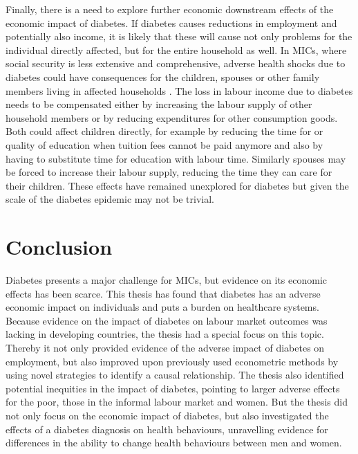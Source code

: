 Finally, there is a need to explore further economic downstream effects of the economic impact of diabetes. If diabetes causes reductions in employment and potentially also income, it is likely that these will cause not only problems for the individual directly affected, but for the entire household as well. In \acp{MIC}, where social security is less extensive and comprehensive, adverse health shocks due to diabetes could have consequences for the children, spouses or other family members living in affected households \parencite{Alam2014}. The loss in labour income due to diabetes needs to be compensated either by increasing the labour supply of other household members or by reducing expenditures for other consumption goods. Both could affect children directly, for example by reducing the time for or quality of education when tuition fees cannot be paid anymore and also by having to substitute time for education with labour time. Similarly spouses may be forced to increase their labour supply, reducing the time they can care for their children. These effects have remained unexplored for diabetes but given the scale of the diabetes epidemic may not be trivial.



\section{Conclusion}

Diabetes presents a major challenge for \acp{MIC}, but evidence on its economic effects has been scarce. This thesis has found that diabetes has an adverse economic impact on individuals and puts a burden on healthcare systems. Because evidence on the impact of diabetes on labour market outcomes was lacking in developing countries, the thesis had a special focus on this topic. Thereby it not only provided evidence of the adverse impact of diabetes on employment, but also improved upon previously used econometric methods by using novel strategies to identify a causal relationship. The thesis also identified potential inequities in the impact of diabetes, pointing to larger adverse effects for the poor, those in the informal labour market and women. But the thesis did not only focus on the economic impact of diabetes, but also investigated the effects of a diabetes diagnosis on health behaviours, unravelling evidence for differences in the ability to change health behaviours between men and women.

